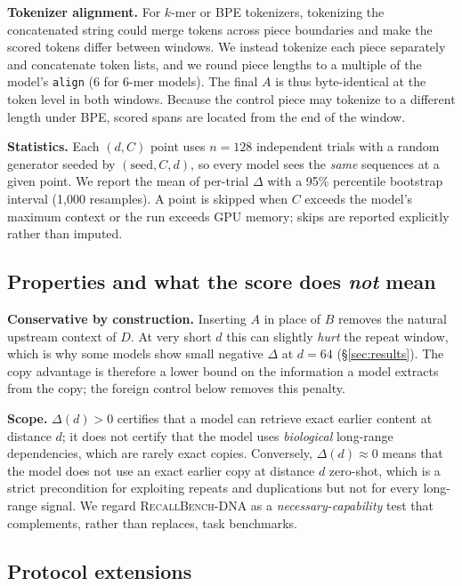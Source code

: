 \textbf{Tokenizer alignment.} For $k$-mer or BPE tokenizers, tokenizing the concatenated
string could merge tokens across piece boundaries and make the scored tokens differ between
windows. We instead tokenize each piece separately and concatenate token lists, and we round
piece lengths to a multiple of the model's \texttt{align} (6 for 6-mer models). The final $A$
is thus byte-identical at the token level in both windows. Because the control piece may
tokenize to a different length under BPE, scored spans are located from the end of the window.

\textbf{Statistics.} Each $(d, C)$ point uses $n=128$ independent trials with a random
generator seeded by $(\text{seed}, C, d)$, so every model sees the \emph{same} sequences at a
given point. We report the mean of per-trial $\Delta$ with a 95\% percentile bootstrap
interval (1{,}000 resamples). A point is skipped when $C$ exceeds the model's maximum context
or the run exceeds GPU memory; skips are reported explicitly rather than imputed.

\subsection{Properties and what the score does \emph{not} mean}

\textbf{Conservative by construction.} Inserting $A$ in place of $B$ removes the natural
upstream context of $D$. At very short $d$ this can slightly \emph{hurt} the repeat window,
which is why some models show small negative $\Delta$ at $d=64$ (\S\ref{sec:results}). The
copy advantage is therefore a lower bound on the information a model extracts from the copy;
the foreign control below removes this penalty.

\textbf{Scope.} $\Delta(d)>0$ certifies that a model can retrieve exact earlier content at
distance $d$; it does not certify that the model uses \emph{biological} long-range
dependencies, which are rarely exact copies. Conversely, $\Delta(d)\approx 0$ means that the
model does not use an exact earlier copy at distance $d$ zero-shot, which is a strict
precondition for exploiting repeats and duplications but not for every long-range signal.
We regard \textsc{RecallBench-DNA} as a \emph{necessary-capability} test that complements,
rather than replaces, task benchmarks.

\subsection{Protocol extensions}
\label{sec:extensions}

